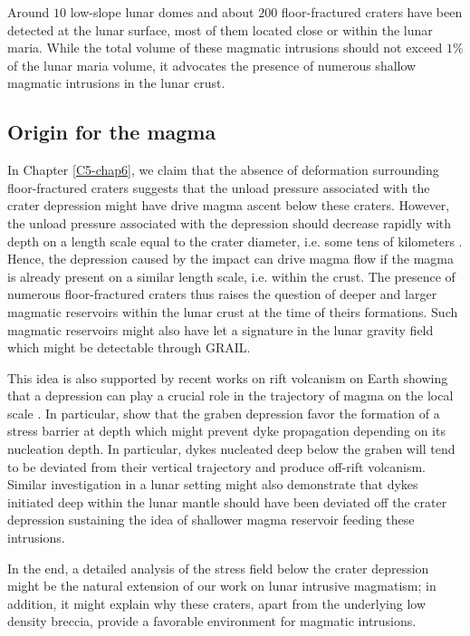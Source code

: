 Around $10$ low-slope lunar domes and about $200$ floor-fractured
craters have been detected at the lunar surface, most of them located
close or within the lunar maria. While the total volume of these
magmatic intrusions should not exceed $1\%$ of the lunar maria volume,
it advocates the presence of numerous shallow magmatic intrusions in
the lunar crust.

\subsection{Origin for the magma}
\label{sec:crust-magm-intr}

In Chapter  \ref{C5-chap6}, we claim  that the absence  of deformation
surrounding floor-fractured craters suggests  that the unload pressure
associated with  the crater depression  might have drive  magma ascent
below these craters. However, the  unload pressure associated with the
depression should decrease rapidly with  depth on a length scale equal
to   the   crater   diameter,    i.e.    some   tens   of   kilometers
\citep{Pinel:2000wa}. Hence,  the depression caused by  the impact can
drive magma flow  if the magma is already present  on a similar length
scale, i.e. within the crust. The presence of numerous floor-fractured
craters  thus  raises  the  question of  deeper  and  larger  magmatic
reservoirs   within  the   lunar   crust  at   the   time  of   theirs
formations. Such magmatic reservoirs might also have let a signature in
the lunar gravity field which might be detectable through GRAIL.

This idea is also supported by recent works on rift volcanism on Earth
showing that a depression can play a crucial role in the trajectory of
magma  on the  local scale  \citep{Maccaferri:2014ft}. In  particular,
\citet{Maccaferri:2014ft} show  that the  graben depression  favor the
formation  of a  stress  barrier  at depth  which  might prevent  dyke
propagation depending  on its  nucleation depth. In  particular, dykes
nucleated deep  below the graben will  tend to be deviated  from their
vertical   trajectory   and   produce  off-rift   volcanism.   Similar
investigation in  a lunar  setting might  also demonstrate  that dykes
initiated deep within  the lunar mantle should have  been deviated off
the  crater   depression  sustaining  the  idea   of  shallower  magma
reservoir feeding these intrusions.

In the end,  a detailed analysis of the stress  field below the crater
depression  might  be the  natural  extension  of  our work  on  lunar
intrusive magmatism; in addition, it  might explain why these craters,
apart from  the underlying  low density  breccia, provide  a favorable
environment for magmatic intrusions.

